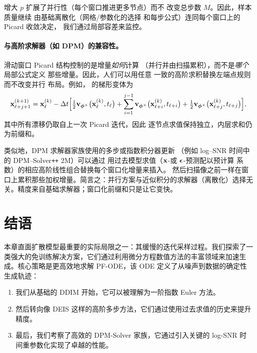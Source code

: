 增大 $p$ 扩展了并行性（每个窗口推进更多节点）而不
改变总步数 $M$。因此，样本质量继续
由基础离散化（网格/参数化的选择
和每步公式）连同每个窗口上的 Picard 收敛决定，
我们通过局部容差来监控。 

\paragraph{与高阶求解器（如 DPM）的兼容性。}
滑动窗口 Picard 结构控制的是增量\emph{如何}计算
（并行并由扫描累积），而不是\emph{哪个}局部公式定义
那些增量。因此，人们可以用任意
一致的高阶求积替换左端点规则而不改变并行
布局。例如， 的梯形变体为
\begin{align*}
    \begin{aligned}
        {\mathbf{x}}^{(k+1)}_{\ell+j+1}
=
{\mathbf{x}}^{(k)}_{\ell}
-\Delta t \Big[
\tfrac{1}{2}{\mathbf{v}}_{{\bm{\phi}}^\times} \big({\mathbf{x}}^{(k)}_{\ell},t_{\ell}\big)
+\sum_{i=1}^{j-1}{\mathbf{v}}_{{\bm{\phi}}^\times} \big({\mathbf{x}}^{(k)}_{\ell+i},t_{\ell+i}\big)
+\tfrac{1}{2}{\mathbf{v}}_{{\bm{\phi}}^\times} \big({\mathbf{x}}^{(k)}_{\ell+j},t_{\ell+j}\big)
\Big],
    \end{aligned}
\end{align*}
其中所有漂移仍取自上一次 Picard 迭代，因此
逐节点求值保持独立，内层求和仍为前缀和。

类似地，DPM 求解器家族使用的多步或指数积分器更新
（例如 log--SNR 时间中的 DPM--Solver\texttt{++} $2$M）可以通过
用过去模型求值（${\mathbf{x}}$-或 ${\bm{\epsilon}}$-预测配以预计算
系数）的相应高阶线性组合替换每个窗口化增量来插入。
然后扫描像之前一样在窗口上累积那些加权增量。简言之：并行方案与近似积分的求解器（离散化）选择无关。精度来自基础求解器；窗口化前缀和只是让它变快。

\newpage
\section{结语}\label{sec:ch9_cr}

本章直面扩散模型最重要的实际局限之一：其缓慢的迭代采样过程。我们探索了一类强大的免训练解决方案，它们通过利用微分方程数值方法的丰富领域来加速生成。核心策略是更高效地求解 PF-ODE，该 ODE 定义了从噪声到数据的确定性生成轨迹：
\begin{enumerate}
    \item 我们从基础的 DDIM 开始，它可以被理解为一阶指数 Euler 方法。
    \item 然后转向像 DEIS 这样的高阶多步方法，它们通过使用过去求值的历史来提升精度。
    \item 最后，我们考察了高效的 DPM-Solver 家族，它通过引入关键的 log-SNR 时间重参数化实现了卓越的性能。
\end{enumerate}

